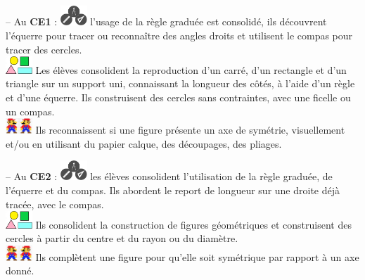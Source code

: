 -- Au {\bf CE1} : \includegraphics[width=10mm]{Geometrie_did/Images/Geo5_cours_outils} l'usage de la règle graduée est consolidé, ils découvrent l'équerre pour tracer ou reconnaître des angles droits et utilisent le compas pour tracer des cercles. \\
   \hspace*{16mm} \includegraphics[width=10mm]{Geometrie_did/Images/Geo5_cours_formes} Les élèves consolident la reproduction d’un carré, d'un rectangle et d'un triangle sur un support uni, connaissant la longueur des côtés, à l'aide d'un règle et d'une équerre. Ils construisent des cercles sans contraintes, avec une ficelle ou un compas. \\
   \hspace*{16mm} \includegraphics[width=10mm]{Geometrie_did/Images/Geo5_cours_symetrie} Ils reconnaissent si une figure présente un axe de symétrie, visuellement et/ou en utilisant du papier calque, des découpages, des pliages. 

-- Au {\bf CE2} : \includegraphics[width=10mm]{Geometrie_did/Images/Geo5_cours_outils} les élèves consolident l’utilisation de la règle graduée, de l’équerre et du compas. Ils abordent le report de longueur sur une droite déjà tracée, avec le compas. \\
   \hspace*{15mm} \includegraphics[width=10mm]{Geometrie_did/Images/Geo5_cours_formes} Ils consolident la construction de figures géométriques et construisent des cercles à partir du centre et du rayon ou du diamètre. \\
   \hspace*{15mm} \includegraphics[width=10mm]{Geometrie_did/Images/Geo5_cours_symetrie} Ils complètent une figure pour qu'elle soit symétrique par rapport à un axe donné.


